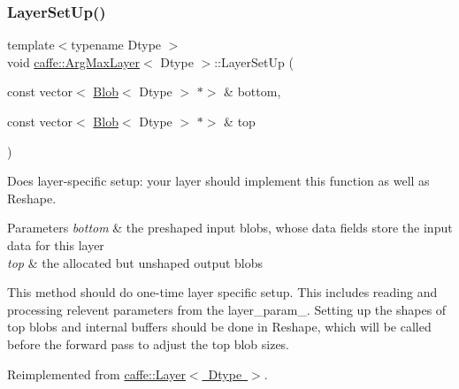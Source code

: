 \mbox{\label{classcaffe_1_1_arg_max_layer_a53069bd5efc4639de93a8111da772572}} 
\subsubsection{\texorpdfstring{Layer\+Set\+Up()}{LayerSetUp()}\hspace{0.1cm}{\footnotesize\ttfamily [2/2]}}
{\footnotesize\ttfamily template$<$typename Dtype $>$ \\
void \mbox{\hyperlink{classcaffe_1_1_arg_max_layer}{caffe\+::\+Arg\+Max\+Layer}}$<$ Dtype $>$\+::Layer\+Set\+Up (\begin{DoxyParamCaption}\item[{const vector$<$ \mbox{\hyperlink{classcaffe_1_1_blob}{Blob}}$<$ Dtype $>$ $\ast$$>$ \&}]{bottom,  }\item[{const vector$<$ \mbox{\hyperlink{classcaffe_1_1_blob}{Blob}}$<$ Dtype $>$ $\ast$$>$ \&}]{top }\end{DoxyParamCaption})\hspace{0.3cm}{\ttfamily [virtual]}}



Does layer-\/specific setup\+: your layer should implement this function as well as Reshape. 


\begin{DoxyParams}{Parameters}
{\em bottom} & the preshaped input blobs, whose data fields store the input data for this layer \\
\hline
{\em top} & the allocated but unshaped output blobs\\
\hline
\end{DoxyParams}
This method should do one-\/time layer specific setup. This includes reading and processing relevent parameters from the {\ttfamily layer\+\_\+param\+\_\+}. Setting up the shapes of top blobs and internal buffers should be done in {\ttfamily Reshape}, which will be called before the forward pass to adjust the top blob sizes. 

Reimplemented from \mbox{\hyperlink{classcaffe_1_1_layer_a481323a3e0972c682787f2137468c29f}{caffe\+::\+Layer$<$ Dtype $>$}}.

\mbox{\label{classcaffe_1_1_arg_max_layer_a658393ef566ec585bf540a1b6f31a929}} 
